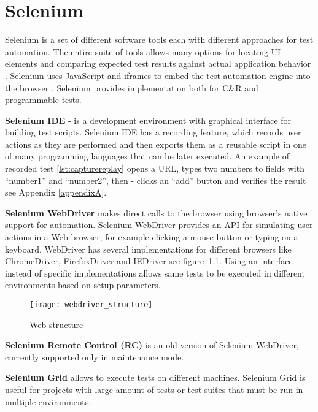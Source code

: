 	\chapter {Selenium}
	\label{ch:selenium}
      Selenium is a set of different software tools each with different
      approaches for test automation. The entire suite of tools
      allows many options for locating UI elements and comparing expected test results
       against actual application behavior \cite{seleniumSite}. Selenium uses
		JavaScript and iframes to embed the test automation engine into the browser
\cite{seleniumDef}. 
        Selenium provides implementation both for C\&R and
       programmable tests.
       
       \textbf{Selenium IDE} - is a development environment with graphical
       interface for building test scripts.
		Selenium IDE has a recording feature,  which records user actions as they are
		performed and then exports them as a reusable script in one of many programming languages that can be later executed.
		An example of recorded test \ref{lst:capturereplay} opens a URL, types two
		numbers to fields with ``number1'' and ``number2'', then -
		clicks an ``add'' button and verifies the result see Appendix \ref{appendixA}.
		
\textbf{Selenium  WebDriver} makes direct calls to the browser using
browser's native support for automation. Selenium WebDriver provides an
API for simulating user actions in a Web browser, for example
clicking a mouse button or typing on a keyboard. WebDriver has several
implementations for different browsers like ChromeDriver, FirefoxDriver
and IEDriver see figure~\ref{fig:webdriver}.
Using an interface instead of specific implementations  allows same tests to be
executed in different environments based on setup parameters.
       
	  \begin{figure}
	  \centering
  		\texttt{[image: webdriver\_structure]}
  		\caption{Web structure}
  		\label{fig:webdriver}
		\end{figure}
		
    	\textbf{Selenium Remote Control (RC)} is an old version of Selenium
    	WebDriver, currently supported only in maintenance mode.
       
       \textbf{Selenium Grid} allows to execute tests on different machines.
       Selenium Grid is useful for projects with large amount of tests or test
       suites that must be run in multiple environments.
       
